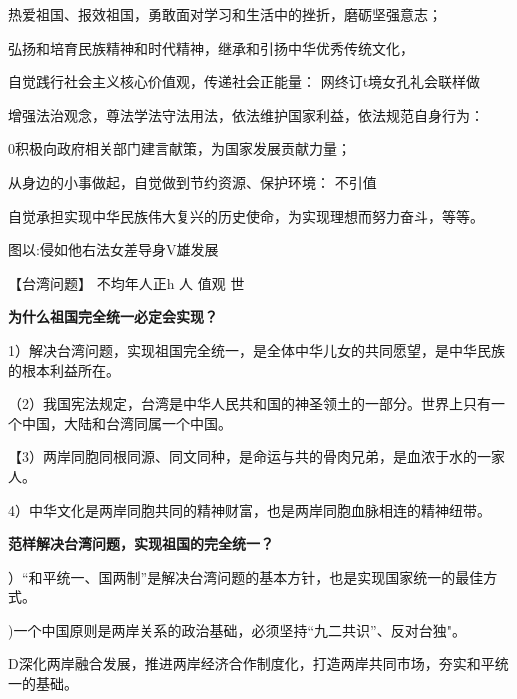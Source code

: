 \documentclass[lang=cn,11pt]{elegantbook}
\begin{document}
热爱祖国、报效祖国，勇敢面对学习和生活中的挫折，磨砺坚强意志；\par

弘扬和培育民族精神和时代精神，继承和引扬中华优秀传统文化，\par

自觉践行社会主义核心价值观，传递社会正能量： 网终订t境女孔礼会联样做\par

增强法治观念，尊法学法守法用法，依法维护国家利益，依法规范自身行为：\par

0积极向政府相关部门建言献策，为国家发展贡献力量；\par

从身边的小事做起，自觉做到节约资源、保护环境： 不引值\par

自觉承担实现中华民族伟大复兴的历史使命，为实现理想而努力奋斗，等等。\par

图以:侵如他右法女差导身V雄发展\par

【台湾问题】 不均年人正h 人 值观 世\par

\textbf{为什么祖国完全统一必定会实现？}\par

1）解决台湾问题，实现祖国完全统一，是全体中华儿女的共同愿望，是中华民族的根本利益所在。\par

（2）我国宪法规定，台湾是中华人民共和国的神圣领土的一部分。世界上只有一个中国，大陆和台湾同属一个中国。\par

【3）两岸同胞同根同源、同文同种，是命运与共的骨肉兄弟，是血浓于水的一家人。\par

4）中华文化是两岸同胞共同的精神财富，也是两岸同胞血脉相连的精神纽带。\par

\textbf{范样解决台湾问题，实现祖国的完全统一？}\par

）“和平统一、国两制”是解决台湾问题的基本方针，也是实现国家统一的最佳方式。\par

)一个中国原则是两岸关系的政治基础，必须坚持“九二共识”、反对台独"。\par

D深化两岸融合发展，推进两岸经济合作制度化，打造两岸共同市场，夯实和平统一的基础。\par
\end{document}
